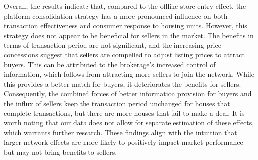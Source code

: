 \documentclass[11pt]{article}
\begin{document}
Overall, the results indicate that, compared to the offline store entry effect, the platform consolidation strategy has a more pronounced influence on both transaction effectiveness and consumer response to housing units. However, this strategy does not appear to be beneficial for sellers in the market. The benefits in terms of transaction period are not significant, and the increasing price concessions suggest that sellers are compelled to adjust listing prices to attract buyers. This can be attributed to the brokerage's increased control of information, which follows from attracting more sellers to join the network. While this provides a better match for buyers, it deteriorates the benefits for sellers. Consequently, the combined forces of better information provision for buyers and the influx of sellers keep the transaction period unchanged for houses that complete transactions, but there are more houses that fail to make a deal. It is worth noting that our data does not allow for separate estimation of these effects, which warrants further research. These findings align with the intuition that larger network effects are more likely to positively impact market performance but may not bring benefits to sellers.

\end{document}
